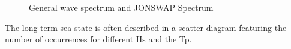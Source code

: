 \begin{figure}[H]
\hfill
{}\hfill
\caption{General wave spectrum and JONSWAP Spectrum \cite{Faltinsen1990}}
\label{fig:spectrum}
\end{figure}

The long term sea state is often described in a scatter diagram featuring the number of occurrences for different Hs and the Tp.  \newline
\newline